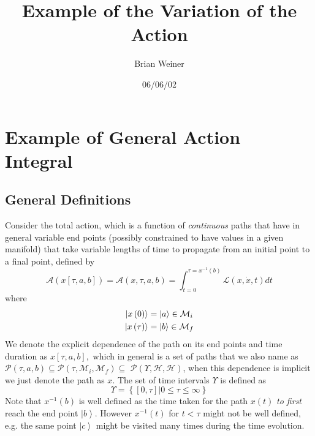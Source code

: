 \documentclass[aps,preprint]{revtex4}
\begin{document}
\preprint{}
\title[Action Variation]{Example of the Variation of the Action}
\author{Brian Weiner}

\begin{abstract}
\end{abstract}

\date{06/06/02}
\endpage{}
\maketitle
\tableofcontents

\section{Example of General Action Integral}

\subsection{General Definitions}

Consider the total action, which is a function of \emph{continuous} paths
that have in general variable end points (possibly constrained to have
values in a given manifold) that take variable lengths of time to propagate
from an initial point to a final point, defined by%
\begin{equation}
\mathcal{A}\left( x\left[ \tau ,a,b\right] \right) =\mathcal{A}\left( x,\tau
,a,b\right) =\int_{t=0}^{\tau =x^{-1}\left( b\right) }\mathcal{L}\left( x,%
\dot{x},t\right) dt
\end{equation}%
where
\begin{align}
\left\vert x\left( 0\right) \right\rangle & =\left\vert a\right\rangle \in
\mathcal{M}_{i}  \notag \\
\left\vert x\left( \tau \right) \right\rangle & =\left\vert b\right\rangle
\in \mathcal{M}_{f}
\end{align}%
We denote the explicit dependence of the path on its end points and time
duration as $x\left[ \tau ,a,b\right] ,$ which in general is a set of paths
that we also name as $\mathcal{P}\left( \tau ,a,b\right) \subseteq \mathcal{P%
}\left( \tau ,\mathcal{M}_{i},\mathcal{M}_{f}\right) \subseteq $ $\mathcal{P}%
\left( \Upsilon ,\mathcal{H},\mathcal{H}\right) $, when this dependence is
implicit we just denote the path as $x$. The set of time intervals $\Upsilon
$ is defined as
\begin{equation}
\Upsilon =\left\{ \left[ 0,\tau \right] |0\leq \tau \leq \infty \right\}
\end{equation}%
Note that $x^{-1}\left( b\right) $ is well defined as the time taken for the
path $x\left( t\right) $ \emph{to first} reach the end point $\left\vert
b\right\rangle $. However $x^{-1}\left( t\right) $ for $t<\tau $ might not
be well defined, e.g. the same point $\left\vert c\right\rangle $ might be
visited many times during the time evolution.
\end{document}
